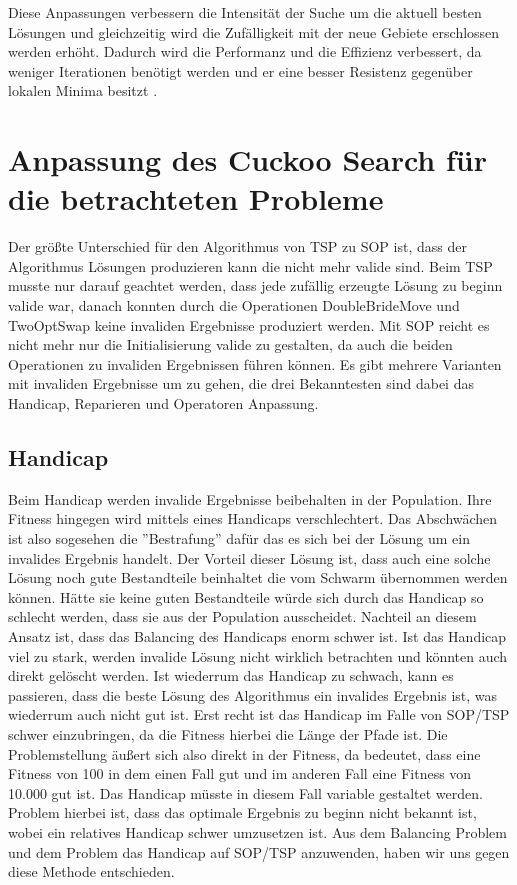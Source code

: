\documentclass[conference]{IEEEtran}
\begin{document}
      Diese Anpassungen verbessern die Intensität der Suche um die aktuell besten Lösungen und gleichzeitig wird 
      die Zufälligkeit mit der neue Gebiete erschlossen werden erhöht. Dadurch wird die Performanz und die Effizienz 
      verbessert, da weniger Iterationen benötigt werden und er eine besser Resistenz gegenüber lokalen Minima besitzt \cite{b9}.

  \section{Anpassung des Cuckoo Search für die betrachteten Probleme}
    Der größte Unterschied für den Algorithmus von TSP zu SOP ist, dass der Algorithmus Lösungen 
    produzieren kann die nicht mehr valide sind. Beim TSP musste nur darauf geachtet werden, 
    dass jede zufällig erzeugte Lösung zu beginn valide war, danach konnten durch die Operationen 
    DoubleBrideMove und TwoOptSwap keine invaliden Ergebnisse produziert werden.
    Mit SOP reicht es nicht mehr nur die Initialisierung valide zu gestalten, da auch die 
    beiden Operationen zu invaliden Ergebnissen führen können. 
    Es gibt mehrere Varianten mit invaliden Ergebnisse um zu gehen, die drei Bekanntesten sind 
    dabei das Handicap, Reparieren und Operatoren Anpassung. 

    \subsection{Handicap}
      Beim Handicap werden invalide 
      Ergebnisse beibehalten in der Population. Ihre Fitness hingegen wird mittels eines Handicaps 
      verschlechtert. Das Abschwächen ist also sogesehen die ''Bestrafung'' dafür das es sich bei der 
      Lösung um ein invalides Ergebnis handelt. Der Vorteil dieser Lösung ist, dass auch eine solche 
      Lösung noch gute Bestandteile beinhaltet die vom Schwarm übernommen werden können. Hätte sie
      keine guten Bestandteile würde sich durch das Handicap so schlecht werden, dass sie aus der
      Population ausscheidet. Nachteil an diesem Ansatz ist, dass das Balancing des Handicaps 
      enorm schwer ist. Ist das Handicap viel zu stark, werden invalide Lösung nicht wirklich 
      betrachten und könnten auch direkt gelöscht werden. Ist wiederrum das Handicap zu schwach, 
      kann es passieren, dass die beste Lösung des Algorithmus ein invalides Ergebnis ist, was 
      wiederrum auch nicht gut ist. Erst recht ist das Handicap im Falle von SOP/TSP schwer 
      einzubringen, da die Fitness hierbei die Länge der Pfade ist. Die Problemstellung äußert 
      sich also direkt in der Fitness, da bedeutet, dass eine Fitness von 100 in dem einen Fall
      gut und im anderen Fall eine Fitness von 10.000 gut ist. Das Handicap müsste in diesem Fall 
      variable gestaltet werden. Problem hierbei ist, dass das optimale Ergebnis zu beginn nicht 
      bekannt ist, wobei ein relatives Handicap schwer umzusetzen ist. Aus dem Balancing Problem 
      und dem Problem das Handicap auf SOP/TSP anzuwenden, haben wir uns gegen diese Methode 
      entschieden.
\end{document}
